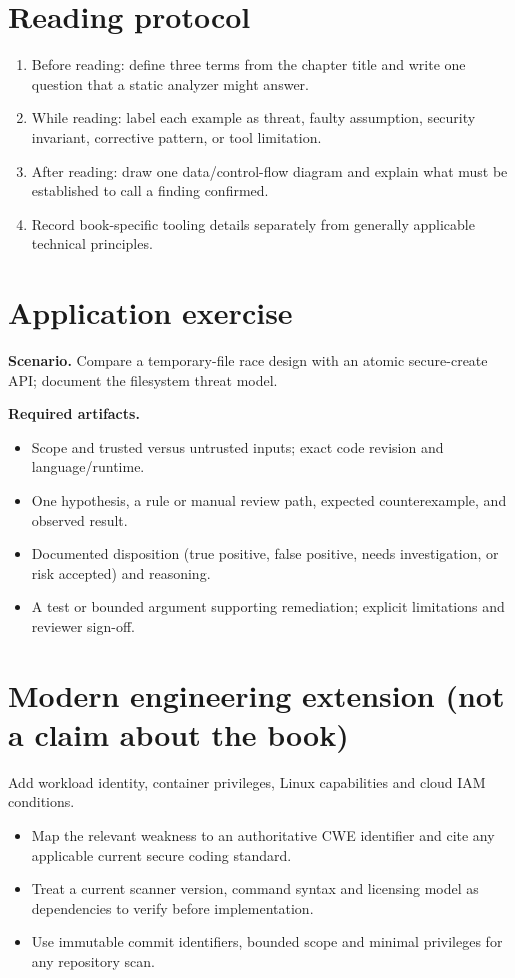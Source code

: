 \documentclass[10pt,letterpaper]{article}
\begin{document}
\section{Reading protocol}
\begin{enumerate}
\item Before reading: define three terms from the chapter title and write one question that a static analyzer might answer.
\item While reading: label each example as threat, faulty assumption, security invariant, corrective pattern, or tool limitation.
\item After reading: draw one data/control-flow diagram and explain what must be established to call a finding confirmed.
\item Record book-specific tooling details separately from generally applicable technical principles.
\end{enumerate}

\section{Application exercise}
\textbf{Scenario.} Compare a temporary-file race design with an atomic secure-create API; document the filesystem threat model.

\textbf{Required artifacts.}\begin{itemize}
\item Scope and trusted versus untrusted inputs; exact code revision and language/runtime.
\item One hypothesis, a rule or manual review path, expected counterexample, and observed result.
\item Documented disposition (true positive, false positive, needs investigation, or risk accepted) and reasoning.
\item A test or bounded argument supporting remediation; explicit limitations and reviewer sign-off.
\end{itemize}

\section{Modern engineering extension (not a claim about the book)}
Add workload identity, container privileges, Linux capabilities and cloud IAM conditions.

\begin{itemize}
\item Map the relevant weakness to an authoritative CWE identifier and cite any applicable current secure coding standard.
\item Treat a current scanner version, command syntax and licensing model as dependencies to verify before implementation.
\item Use immutable commit identifiers, bounded scope and minimal privileges for any repository scan.
\end{itemize}
\end{document}
